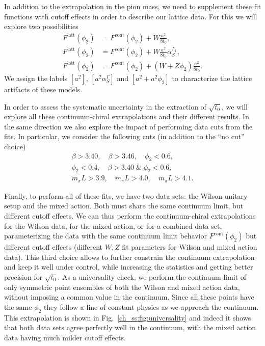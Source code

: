 In addition to the extrapolation in the pion mass, we need to supplement these fit functions with cutoff effects in order to describe our lattice data. For this we will explore two possibilities
\begin{align}
\label{ch_ss:eq:a2}
F^{\textrm{latt}}(\phi_2)&=F^{\textrm{cont}}(\phi_2)+W\frac{a^2}{8t_0},\\
F^{\textrm{latt}}(\phi_2)&=F^{\textrm{cont}}(\phi_2)+W\frac{a^2}{8t_0}\alpha_S^{\Gamma_1},\\
F^{\textrm{latt}}(\phi_2)&=F^{\textrm{cont}}(\phi_2)+\left(W+Z\phi_2\right)\frac{a^2}{8t_0}.
\end{align}
We assign the labels $[a^2]$, $[a^2\alpha_S^{\Gamma}]$ and $[a^2+a^2\phi_2]$ to characterize the lattice artifacts of these models.

In order to assess the systematic uncertainty in the extraction of $\sqrt{t_0}$, we will explore all these continuum-chiral extrapolations and their different results. In the same direction we also explore the impact of performing data cuts from the fits. In particular, we consider the following cuts (in addition to the ``no cut'' choice)
\begin{gather}
\beta>3.40, \quad
\beta>3.46, \quad
\phi_2<0.6, \\
\phi_2<0.4, \quad
\beta>3.40\;\&\;\phi_2<0.6, \\
m_{\pi}L>3.9, \quad
m_{\pi}L>4.0, \quad
m_{\pi}L>4.1.
\end{gather}

Finally, to perform all of these fits, we have two data sets: the Wilson unitary setup and the mixed action. Both must share the same continuum limit, but different cutoff effects. We can thus perform the continuum-chiral extrapolations for the Wilson data, for the mixed action, or for a combined data set, parameterizing the data with the same continuum limit behavior $F^{\textrm{cont}}(\phi_2)$ but different cutoff effects (different $W,Z$ fit parameters for Wilson and mixed action data). This third choice allows to further constrain the continuum extrapolation and keep it well under control, while increasing the statistics and getting better precision for $\sqrt{t_0}$. As a universality check, we perform the continuum limit of only symmetric point ensembles of both the Wilson and mixed action data, without imposing a common value in the continuum. Since all these points have the same $\phi_2$ they follow a line of constant physics as we approach the continuum. This extrapolation is shown in Fig.~\ref{ch_ss:fig:universality} and indeed it shows that both data sets agree perfectly well in the continuum, with the mixed action data having much milder cutoff effects.

